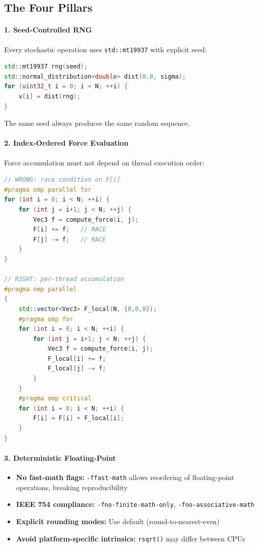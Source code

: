 \documentclass[11pt]{article}
\begin{document}
\subsection{The Four Pillars}

\paragraph{1. Seed-Controlled RNG}

Every stochastic operation uses \texttt{std::mt19937} with explicit seed:

\begin{lstlisting}[language=C++]
std::mt19937 rng(seed);
std::normal_distribution<double> dist(0.0, sigma);
for (uint32_t i = 0; i < N; ++i) {
    v[i] = dist(rng);
}
\end{lstlisting}

The same seed always produces the same random sequence.

\paragraph{2. Index-Ordered Force Evaluation}

Force accumulation must not depend on thread execution order:

\begin{lstlisting}[language=C++]
// WRONG: race condition on F[i]
#pragma omp parallel for
for (int i = 0; i < N; ++i) {
    for (int j = i+1; j < N; ++j) {
        Vec3 f = compute_force(i, j);
        F[i] += f;   // RACE
        F[j] -= f;   // RACE
    }
}

// RIGHT: per-thread accumulation
#pragma omp parallel
{
    std::vector<Vec3> F_local(N, {0,0,0});
    #pragma omp for
    for (int i = 0; i < N; ++i) {
        for (int j = i+1; j < N; ++j) {
            Vec3 f = compute_force(i, j);
            F_local[i] += f;
            F_local[j] -= f;
        }
    }
    #pragma omp critical
    for (int i = 0; i < N; ++i) {
        F[i] = F[i] + F_local[i];
    }
}
\end{lstlisting}

\paragraph{3. Deterministic Floating-Point}

\begin{itemize}
\item \textbf{No fast-math flags:} \texttt{-ffast-math} allows reordering of floating-point operations, breaking reproducibility
\item \textbf{IEEE 754 compliance:} \texttt{-fno-finite-math-only}, \texttt{-fno-associative-math}
\item \textbf{Explicit rounding modes:} Use default (round-to-nearest-even)
\item \textbf{Avoid platform-specific intrinsics:} \texttt{rsqrt()} may differ between CPUs
\end{itemize}
\end{document}

